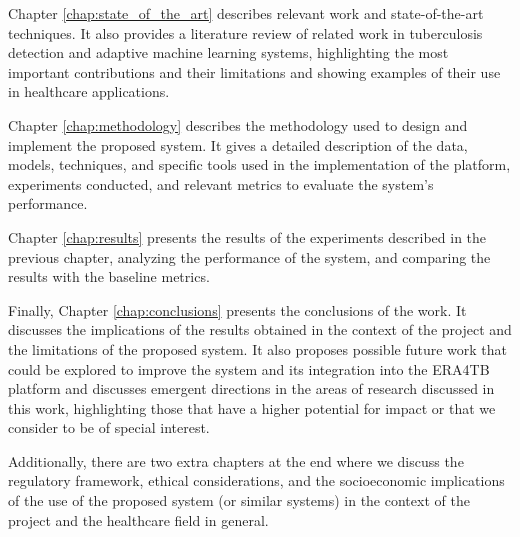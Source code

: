 \documentclass[../main.tex]{subfiles}
\begin{document}
    Chapter \ref{chap:state_of_the_art} describes relevant work and state-of-the-art techniques. It also provides a literature review of related work in tuberculosis detection and adaptive machine learning systems, highlighting the most important contributions and their limitations and showing examples of their use in healthcare applications.

    Chapter \ref{chap:methodology} describes the methodology used to design and implement the proposed system.  It gives a detailed description of the data, models, techniques, and specific tools used in the implementation of the platform, experiments conducted, and relevant metrics to evaluate the system's performance.
    
    Chapter \ref{chap:results} presents the results of the experiments described in the previous chapter, analyzing the performance of the system, and comparing the results with the baseline metrics.
    
    Finally, Chapter \ref{chap:conclusions} presents the conclusions of the work. It discusses the implications of the results obtained in the context of the project and the limitations of the proposed system. It also proposes possible future work that could be explored to improve the system and its integration into the ERA4TB platform and discusses emergent directions in the areas of research discussed in this work, highlighting those that have a higher potential for impact or that we consider to be of special interest.

    Additionally, there are two extra chapters at the end where we discuss the regulatory framework, ethical considerations, and the socioeconomic implications of the use of the proposed system (or similar systems) in the context of the project and the healthcare field in general.
    

\end{document}
